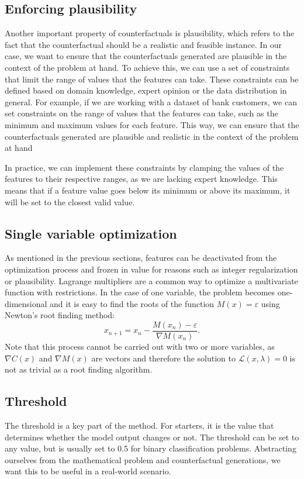 \documentclass[12pt]{extarticle}
\numberwithin{equation}{section}
\begin{document}
\subsection{Enforcing plausibility}\label{sec:enforcing_plausibility}
Another important property of counterfactuals is plausibility, which refers to the fact that the counterfactual should be a realistic and feasible instance. In our case, we want to ensure that the counterfactuals generated are plausible in the context of the problem at hand. To achieve this, we can use a set of constraints that limit the range of values that the features can take. These constraints can be defined based on domain knowledge, expert opinion or the data distribution in general. For example, if we are working with a dataset of bank customers, we can set constraints on the range of values that the features can take, such as the minimum and maximum values for each feature. This way, we can ensure that the counterfactuals generated are plausible and realistic in the context of the problem at hand

In practice, we can implement these constraints by clamping the values of the features to their respective ranges, as we are lacking expert knowledge. This means that if a feature value goes below its minimum or above its maximum, it will be set to the closest valid value. 

\subsection{Single variable optimization}\label{sec:single}
As mentioned in the previous sections, features can be deactivated from the optimization process and frozen in value for reasons such as integer regularization or plausibility. Lagrange multipliers are a common way to optimize a multivariate function with restrictions. In the case of one variable, the problem becomes one-dimensional and it is easy to find the roots of the function $M(x) = \varepsilon$ using Newton's root finding method:
\begin{equation}
    x_{n+1} = x_n - \frac{M(x_n) - \varepsilon}{\nabla M(x_n)}.
\end{equation}
Note that this process cannot be carried out with two or more variables, as $\nabla C(x)$ and $\nabla M(x)$ are vectors and therefore the solution to $\mathcal{L}(x, \lambda) = 0$ is not as trivial as a root finding algorithm.

\subsection{Threshold}\label{sec:threshold}
The threshold is a key part of the method. For starters, it is the value that determines whether the model output changes or not. The threshold can be set to any value, but is usually set to 0.5 for binary classification problems. Abstracting ourselves from the mathematical problem and counterfactual generations, we want this to be useful in a real-world scenario. 
\end{document}
